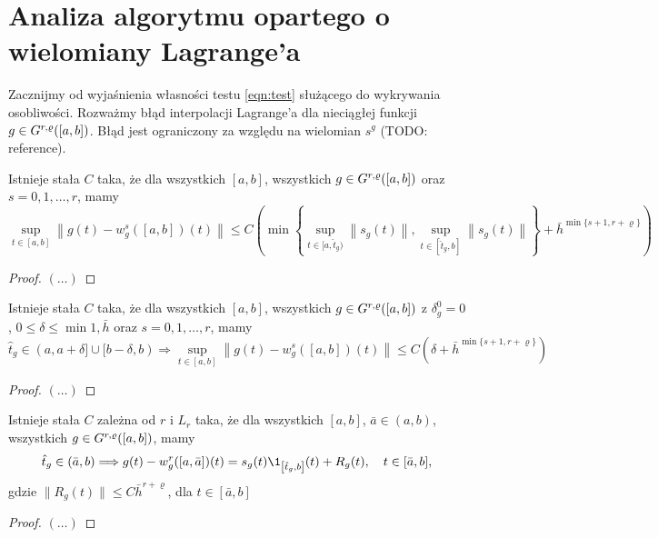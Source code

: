 \documentclass[oik, pdftex, robocza, man]{mgrwms}
\begin{document}
\section{Analiza algorytmu opartego o wielomiany Lagrange'a}


    Zacznijmy od wyjaśnienia własności testu \ref{eqn:test} służącego do wykrywania osobliwości. Rozważmy błąd interpolacji Lagrange'a dla nieciągłej funkcji $g \in G^{r,\varrho}([a,b])$. Błąd jest ograniczony za względu na wielomian $s^{g}$ (TODO: reference).

    \begin{lemma}
        Istnieje stała $C$ taka, że dla wszystkich $[a,b]$, wszystkich $g \in G^{r,\varrho}([a,b])$ oraz $s=0,1,\dots,r$, mamy
        \begin{equation*}
            \sup _{t \in[a, b]}\left\|g(t)-w_{g}^{s}([a, b])(t)\right\| \leq C\left(\min \left\{\sup_{t \in[a, \hat{t}_{g})}\left\|s_{g}(t)\right\|, \sup _{t \in [\hat{t}_{g}, b]}\left\|s_{g}(t)\right\|\right\}+\bar{h}^{\min \{s+1, r+\varrho\}}\right)
        \end{equation*}
    \end{lemma}
    \begin{proof}
        $(\dots)$
    \end{proof}

    \begin{cor}
        Istnieje stała $C$ taka, że dla wszystkich $[a,b]$, wszystkich $g \in G^{r,\varrho}([a,b])$ z $\delta_{g}^{0} = 0$, $0 \leq \delta \leq \min{1, \bar{h}}$ oraz $s=0,1,\dots,r$, mamy
        \begin{equation*}
            \hat{t}_{g} \in(a, a+\delta] \cup[b-\delta, b) \Longrightarrow  \sup_{t \in[a, b]}\left\|g(t)-w_{g}^{s}([a, b])(t)\right\| \leq C\left(\delta+\bar{h}^{\min \{s+1, r+\varrho\}}\right)
        \end{equation*}
    \end{cor}
    \begin{proof}
        $(\dots)$
    \end{proof}

    \begin{lemma}
        Istnieje stała $C$ zależna od $r$ i $L_{r}$ taka, że dla wszystkich $[a,b]$, $\bar{a} \in (a,b)$, wszystkich $g \in G^{r,\varrho}([a,b])$, mamy
        \begin{equation*}
            \hat{t}_{g} \in(\bar{a}, b) \Longrightarrow g(t)-w_{g}^{r}([a, \bar{a}])(t)=s_{g}(t) \1_{\left[\hat{t}_{g}, b\right]}(t)+R_{g}(t), \quad t \in[\bar{a}, b],
        \end{equation*}
        gdzie $\| R_{g}(t) \| \leq C\bar{h}^{r+\varrho}$, dla $t \in [\bar{a}, b]$
    \end{lemma}
    \begin{proof}
        $(\dots)$
    \end{proof}
\end{document}
